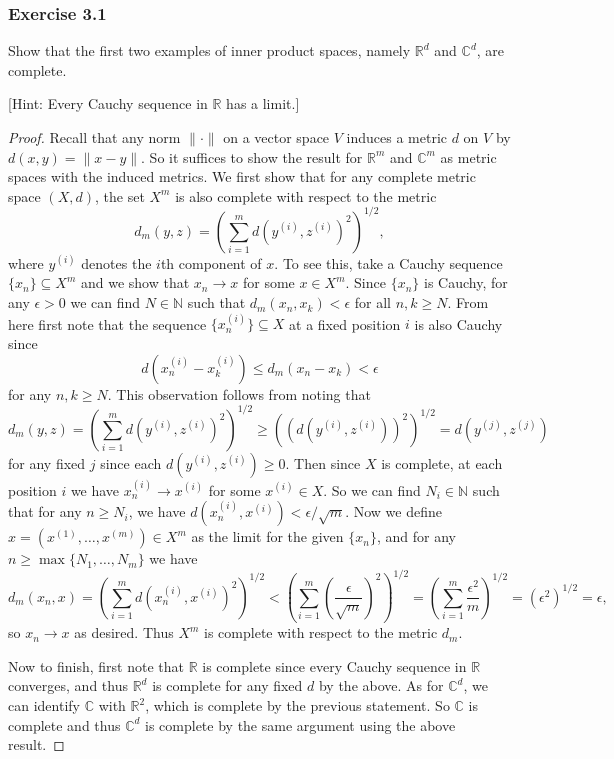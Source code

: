 \documentclass[letterpaper, 12pt]{article}
\newcommand{\R}{\mathbb{R}}
\newcommand{\N}{\mathbb{N}}
\newcommand{\C}{\mathbb{C}}
\begin{document}
\subsubsection{Exercise 3.1}
\begin{tcolorbox}
  Show that the first two examples of inner product
  spaces, namely $\R^d$ and $\C^d$, are complete.

  [Hint: Every Cauchy sequence in $\R$ has a limit.]
\end{tcolorbox}

\begin{proof}
  Recall that any norm $\|{\cdot}\|$ on a vector space
  $V$ induces a metric $d$ on $V$ by
  $d(x, y) = \|x - y\|$. So it suffices to show the
  result for $\R^m$ and $\C^m$ as metric spaces
  with the induced metrics.
  We first show that for any complete metric space
  $(X, d)$, the set $X^m$ is also complete with
  respect to the metric
  \[
    d_m(y, z) = \left(\sum_{i = 1}^m d(y^{(i)}, z^{(i)})^2\right)^{1 / 2},
  \]
  where $y^{(i)}$ denotes the $i$th component of $x$.
  To see this, take a Cauchy sequence
  $\{x_n\} \subseteq X^m$ and we show that
  $x_n \to x$ for some $x \in X^m$.
  Since $\{x_n\}$ is Cauchy, for any $\epsilon > 0$
  we can find $N \in \N$ such that
  $d_m(x_n, x_k) < \epsilon$ for all $n, k \ge N$.
  From here first note that the sequence
  $\{x^{(i)}_n\} \subseteq X$ at a fixed position $i$
  is also Cauchy since
  \[
  d(x^{(i)}_n - x^{(i)}_k)
  \le d_m(x_n - x_k) < \epsilon
  \]
  for any $n, k \ge N$. This observation follows from
  noting that
  \[
    d_m(y, z) = \left(\sum_{i = 1}^m d(y^{(i)}, z^{(i)})^2\right)^{1 / 2}
    \ge \left((d(y^{(i)}, z^{(i)}))^2\right)^{1 / 2}
    = d(y^{(j)}, z^{(j)})
  \]
  for any fixed $j$ since each
  $d(y^{(i)}, z^{(i)}) \ge 0$.
  Then since $X$
  is complete, at each position $i$ we have
  $x^{(i)}_n \to x^{(i)}$ for some $x^{(i)} \in X$.
  So we can find $N_i \in \N$ such that for
  any $n \ge N_i$, we have
  $d(x^{(i)}_n, x^{(i)}) < \epsilon / \sqrt{m}$.
  Now we define $x = (x^{(1)}, \ldots, x^{(m)}) \in X^m$
  as the limit for the given $\{x_n\}$, and
  for any $n \ge \max\{N_1, \ldots, N_m\}$ we have
  \[
    d_m(x_n, x)
    = \left(\sum_{i = 1}^m d(x^{(i)}_n, x^{(i)})^2\right)^{1 / 2}
    < \left(\sum_{i = 1}^m \left(\frac{\epsilon}{\sqrt{m}}\right)^2\right)^{1 / 2}
    = \left(\sum_{i = 1}^m \frac{\epsilon^2}{m}\right)^{1 / 2}
    = (\epsilon^2)^{1 / 2}
    = \epsilon,
  \]
  so $x_n \to x$ as desired. Thus $X^m$ is complete
  with respect to the metric $d_m$.

  Now to finish, first note that $\R$ is complete
  since every Cauchy sequence in $\R$ converges,
  and thus $\R^d$ is complete for any fixed $d$ by the
  above. As for $\C^d$, we can identify $\C$ with
  $\R^2$, which is complete by the previous statement.
  So $\C$ is complete and thus $\C^d$ is complete
  by the same argument using the above result.
\end{proof}
\end{document}
